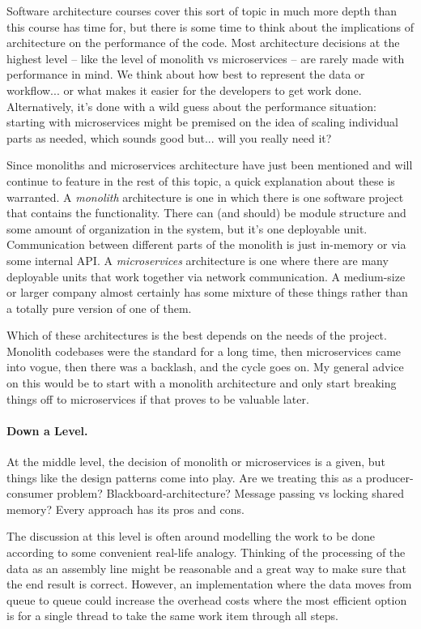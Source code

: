 Software architecture courses cover this sort of topic in much more depth than this course has time for, but there is some time to think about the implications of architecture on the performance of the code. Most architecture decisions at the highest level -- like the level of monolith vs microservices -- are rarely made with performance in mind. We think about how best to represent the data or workflow... or what makes it easier for the developers to get work done. Alternatively, it's done with a wild guess about the performance situation: starting with microservices might be premised on the idea of scaling individual parts as needed, which sounds good but... will you really need it?

Since monoliths and microservices architecture have just been mentioned and will continue to feature in the rest of this topic, a quick explanation about these is warranted. A \textit{monolith} architecture is one in which there is one software project that contains the functionality. There can (and should) be module structure and some amount of organization in the system, but it's one deployable unit. Communication between different parts of the monolith is just in-memory or via some internal API. A \textit{microservices} architecture is one where there are many deployable units that work together via network communication. A medium-size or larger company almost certainly has some mixture of these things rather than a totally pure version of one of them. 

Which of these architectures is the best depends on the needs of the project. Monolith codebases were the standard for a long time, then microservices came into vogue, then there was a backlash, and the cycle goes on. My general advice on this would be to start with a monolith architecture and only start breaking things off to microservices if that proves to be valuable later.

\paragraph{Down a Level.} At the middle level, the decision of monolith or microservices is a given, but things like the design patterns come into play. Are we treating this as a producer-consumer problem? Blackboard-architecture? Message passing vs locking shared memory? Every approach has its pros and cons.

The discussion at this level is often around modelling the work to be done according to some convenient real-life analogy. Thinking of the processing of the data as an assembly line might be reasonable and a great way to make sure that the end result is correct. However, an implementation where the data moves from queue to queue could increase the overhead costs where the most efficient option is for a single thread to take the same work item through all steps. 


